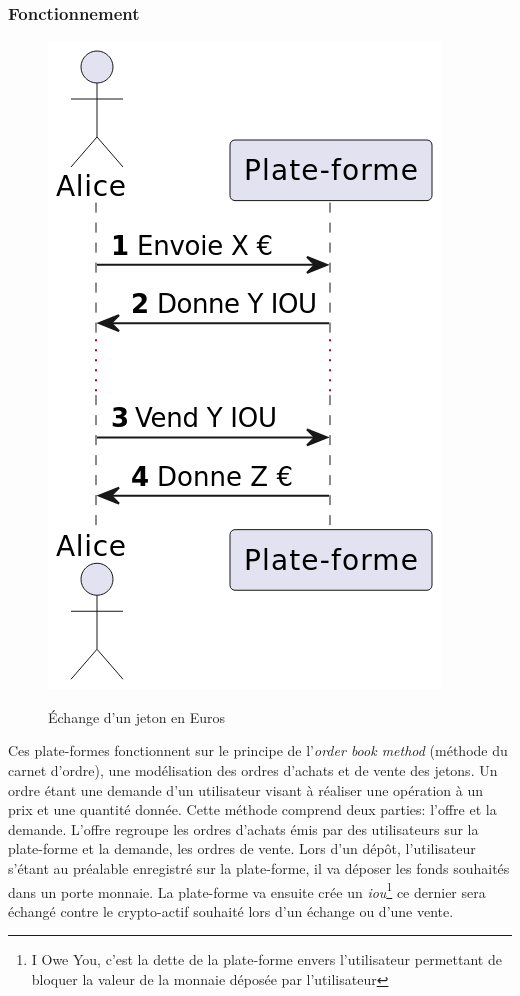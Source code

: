 \subsubsection{Fonctionnement}
\begin{figure}[h!]
    \centering
    \includegraphics[scale=0.2]{centralisation/Achat-Vente.png}
    \label{fig:simplifiedcex}
    \caption{Échange d'un jeton en Euros}
\end{figure}
Ces plate-formes fonctionnent sur le principe de l'\textit{order book method} (méthode du carnet d'ordre\cite{orderBook}), une modélisation des ordres d'achats et de vente des jetons.
Un ordre étant une demande d'un utilisateur visant à réaliser une opération à un prix et une quantité donnée. 
Cette méthode comprend deux parties: l'offre et la demande. L'offre regroupe les ordres d'achats émis par des utilisateurs sur la plate-forme et la demande, les ordres de vente.
Lors d'un dépôt, l'utilisateur s'étant au préalable enregistré sur la plate-forme, il va déposer les fonds souhaités dans un porte monnaie. 
La plate-forme va ensuite crée un \textit{\acrshort{iou}}\footnote{I Owe You, c'est la dette de la plate-forme envers l'utilisateur permettant de bloquer la valeur de la monnaie déposée par l'utilisateur\cite{IOU}} 
ce dernier sera échangé contre le crypto-\gls{actif} souhaité lors d'un échange ou d'une vente. \\ 


